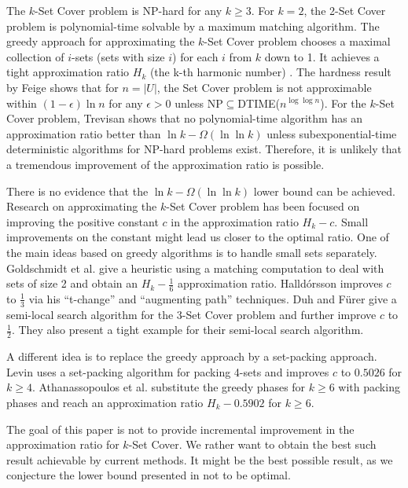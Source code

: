 \documentclass[runningheads,a4paper]{llncs}
\numberwithin{equation}{section}
\begin{document}
The $k$-Set Cover problem is NP-hard for any $k\geq 3$. For $k=2$, the 2-Set Cover problem is polynomial-time solvable by a maximum matching algorithm. The greedy approach for approximating the $k$-Set Cover problem chooses a maximal collection of $i$-sets (sets with size $i$) for each $i$ from $k$ down to 1. It achieves a tight approximation ratio $H_k$ (the k-th harmonic number) \cite{johnson}. The hardness result by Feige \cite{feige} shows that for $n=|U|$, the Set Cover problem is not approximable within $(1-\epsilon)\ln n$ for any $\epsilon>0$ unless NP$\subseteq$DTIME($n^{\log\log n}$). For the $k$-Set Cover problem, Trevisan \cite{trevisan} shows that no polynomial-time algorithm has an approximation ratio better than $\ln k-\Omega(\ln\ln k)$ unless subexponential-time deterministic algorithms for NP-hard problems exist. Therefore, it is unlikely that a tremendous improvement of the approximation ratio is possible.

There is no evidence that the $\ln k-\Omega(\ln\ln k)$ lower bound can be achieved. Research on approximating the $k$-Set Cover problem has been focused on improving the positive constant $c$ in the approximation ratio $H_k-c$. Small improvements on the constant might lead us closer to the optimal ratio. One of the main ideas based on greedy algorithms is to handle small sets separately. Goldschmidt et al. \cite{gold} give a heuristic using a matching computation to deal with sets of size 2 and obtain an $H_k-\frac{1}{6}$ approximation ratio. Halld\'{o}rsson \cite{hall2} improves $c$ to $\frac{1}{3}$ via his ``t-change''  and ``augmenting path'' techniques. Duh and F\"{u}rer \cite{furer} give a semi-local search algorithm for the 3-Set Cover problem and further improve $c$ to $\frac{1}{2}$. They also present a tight example for their semi-local search algorithm.

A different idea is to replace the greedy approach by a set-packing approach. Levin \cite{levin} uses a set-packing algorithm for packing 4-sets and improves $c$ to $0.5026$ for $k\geq 4$. Athanassopoulos et al. \cite{lp} substitute the greedy phases for $k\geq 6$ with packing phases and reach an approximation ratio $H_k-0.5902$ for $k\geq 6$.

The goal of this paper is not to provide incremental improvement in the approximation ratio for $k$-Set Cover. We rather want to obtain the best such result achievable by current methods. It might be the best possible result, as we conjecture the lower bound presented in \cite{trevisan} not to be optimal.
\end{document}
